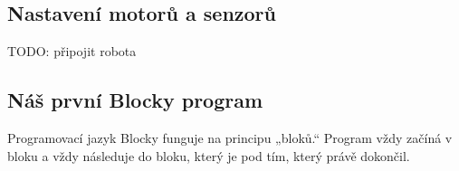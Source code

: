 \documentclass[../main.tex]{subfiles}
\begin{document}
	\subsection{Nastavení motorů a senzorů}

	TODO: připojit robota

	\subsection{Náš první Blocky program}

	Programovací jazyk Blocky funguje na principu „bloků.“ Program vždy začíná v bloku  a vždy následuje do bloku, který je pod tím, který právě dokončil.

	
\end{document}
